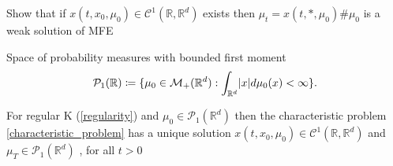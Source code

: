 \begin{exercise}
 Show that if $x(t,x_0,\mu_0) \in  \mathcal{C}^{1}(\mathbb{R},\mathbb{R}^{d } ) $  exists 
 then $\mu_t = x(t,*,\mu_0)\#\mu_0$ is a weak solution of MFE
\end{exercise}
\begin{definition}
  Space of probability measures with bounded first moment
  \begin{align*}
    \mathcal{P}_1(\mathbb{R}) \coloneqq  \{\mu_0 \in  \mathcal{M}_{+}(\mathbb{R}^{d } ) : \int_{\mathbb{R}^{d } } \lvert x\rvert d\mu_0(x) <\infty\}  
  .\end{align*}
\end{definition}
\begin{theorem}
  For regular K (\ref{regularity})  and  $\mu_0 \in  \mathcal{P}_1(\mathbb{R}^{d } )$ then the characteristic problem \ref{characteristic_problem} has a unique solution 
  $x(t,x_0,\mu_0) \in  \mathcal{C}^{1}(\mathbb{R},\mathbb{R}^{d} ) $ and $\mu_T \in  \mathcal{P}_1(\mathbb{R}^{d} )$ , for all $t>0 $
\end{theorem}
